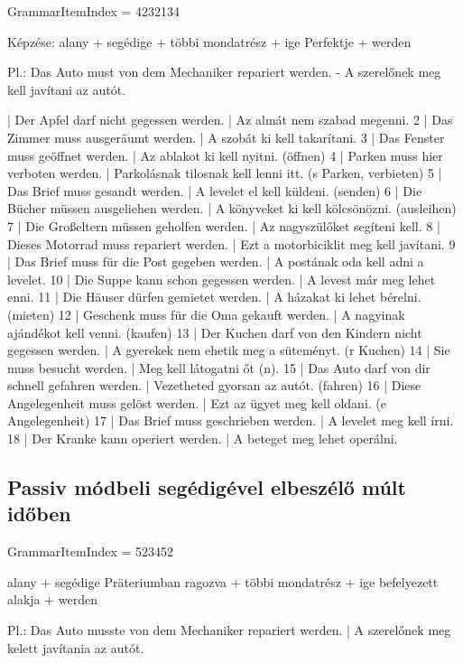 \documentclass{article}
\newenvironment{desc}{\verbatim}{\endverbatim}
\newenvironment{exmp}{\verbatim}{\endverbatim}
\begin{document}
GrammarItemIndex = 4232134

\begin{desc}
Képzése:
alany + segédige + többi mondatrész + ige Perfektje + werden

Pl.: Das Auto must von dem Mechaniker repariert werden. - A szerelőnek meg kell javítani az autót.
\end{desc}

\begin{exmp}
1 | Der Apfel darf nicht gegessen werden. | Az almát nem szabad megenni.
2 | Das Zimmer muss ausgeräumt werden. | A szobát ki kell takarítani.
3 | Das Fenster muss geöffnet werden. | Az ablakot ki kell nyitni. (öffnen)
4 | Parken muss hier verboten werden. | Parkolásnak tilosnak kell lenni itt. (s Parken, verbieten)
5 | Das Brief muss gesandt werden. | A levelet el kell küldeni. (senden)
6 | Die Bücher müssen ausgeliehen werden. | A könyveket ki kell kölcsönözni. (ausleihen)
7 | Die Großeltern müssen geholfen werden. | Az nagyszülőket segíteni kell.
8 | Dieses Motorrad muss repariert werden. | Ezt a motorbiciklit meg kell javítani.
9 | Das Brief muss für die Post gegeben werden. | A postának oda kell adni a levelet.
10 | Die Suppe kann schon gegessen werden. | A levest már meg lehet enni.
11 | Die Häuser dürfen gemietet werden. | A házakat ki lehet bérelni. (mieten)
12 | Geschenk muss für die Oma gekauft werden. | A nagyinak ajándékot kell venni. (kaufen)
13 | Der Kuchen darf von den Kindern nicht gegessen werden. | A gyerekek nem ehetik meg a süteményt. (r Kuchen)
14 | Sie muss besucht werden. | Meg kell látogatni őt (n).
15 | Das Auto darf von dir schnell gefahren werden. | Vezetheted gyorsan az autót. (fahren)
16 | Diese Angelegenheit muss gelöst werden. | Ezt az ügyet meg kell oldani. (e Angelegenheit)
17 | Das Brief muss geschrieben werden. | A levelet meg kell írni.
18 | Der Kranke kann operiert werden. | A beteget meg lehet operálni.
\end{exmp}

\subsection{Passiv módbeli segédigével elbeszélő múlt időben}

GrammarItemIndex = 523452

\begin{desc}
alany + segédige Präteriumban ragozva + többi mondatrész + ige befelyezett alakja + werden

Pl.: Das Auto musste von dem Mechaniker repariert werden. | A szerelőnek meg kelett javítania az autót.
\end{desc}
\end{document}
